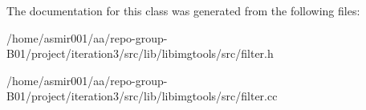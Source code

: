 The documentation for this class was generated from the following files\+:\begin{DoxyCompactItemize}
\item 
/home/asmir001/aa/repo-\/group-\/\+B01/project/iteration3/src/lib/libimgtools/src/filter.\+h\item 
/home/asmir001/aa/repo-\/group-\/\+B01/project/iteration3/src/lib/libimgtools/src/filter.\+cc\end{DoxyCompactItemize}
